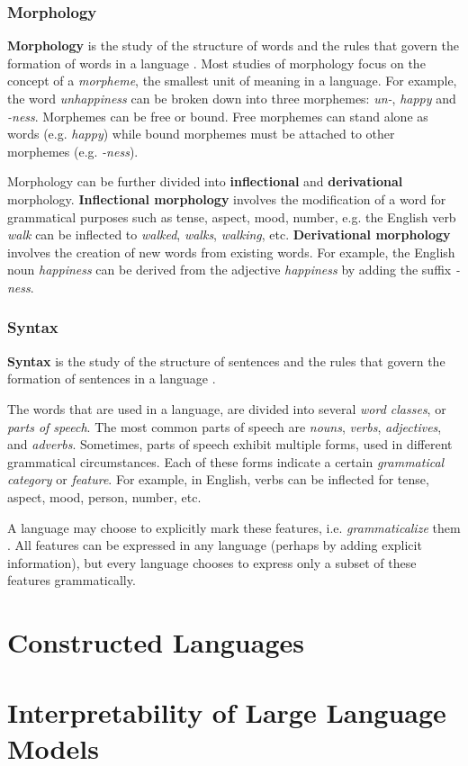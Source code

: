 \subsubsection{Morphology}
\textbf{Morphology} is the study of the structure of words and the rules that govern the formation of words in a language \cite{trask2007language}.
Most studies of morphology focus on the concept of a \textit{morpheme}, the smallest unit of meaning in a language. For example, the word \textit{unhappiness}
can be broken down into three morphemes: \textit{un-}, \textit{happy} and \textit{-ness}. Morphemes can be free or bound. Free morphemes can stand
alone as words (e.g. \textit{happy}) while bound morphemes must be attached to other morphemes (e.g. \textit{-ness}).

Morphology can be further divided into \textbf{inflectional} and \textbf{derivational} morphology. \textbf{Inflectional morphology} involves the
modification of a word for grammatical purposes such as tense, aspect, mood, number, e.g. the English verb \textit{walk} can be inflected to
\textit{walked}, \textit{walks}, \textit{walking}, etc. \textbf{Derivational morphology} involves the creation of new words from existing words.
For example, the English noun \textit{happiness} can be derived from the adjective \textit{happiness} by adding the suffix \textit{-ness}.

\subsubsection{Syntax}
\textbf{Syntax} is the study of the structure of sentences and the rules that govern the formation of sentences in a language \cite{trask2007language}.

The words that are used in a language, are divided into several \textit{word classes}, or \textit{parts of speech}. The most common parts of speech
are \textit{nouns}, \textit{verbs}, \textit{adjectives}, and \textit{adverbs}. Sometimes, parts of speech exhibit multiple forms, used in different
grammatical circumstances. Each of these forms indicate a certain \textit{grammatical category} or \textit{feature}. For example, in English, verbs
can be inflected for tense, aspect, mood, person, number, etc.

A language may choose to explicitly mark these features, i.e. \textit{grammaticalize} them \cite{rosenfelder2010language}. All features can be
expressed in any language (perhaps by adding explicit information), but every language chooses to express only a subset of these features grammatically.


\section{Constructed Languages}

\section{Interpretability of Large Language Models}

